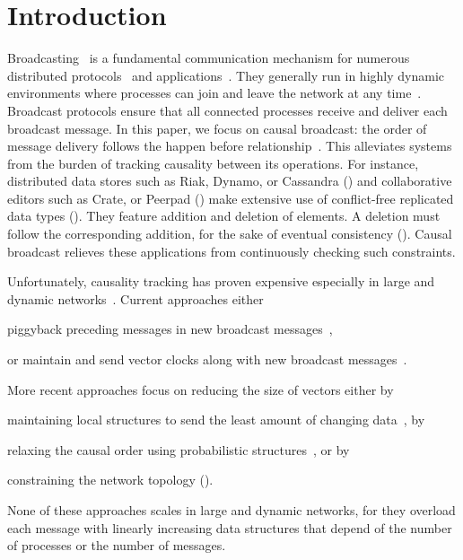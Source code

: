 
\section{Introduction}


Broadcasting~\cite{hadzilacos1994modular} is a fundamental communication
mechanism for numerous distributed
protocols~\cite{nakamoto2009bitcoin,shapiro2011comprehensive} and
applications~\cite{nedelec2016crate}. They generally run in highly dynamic
environments where processes can join and leave the network at any
time~\cite{mostefaoui2005static}. Broadcast protocols ensure that all connected
processes receive and deliver each broadcast message.
In this paper, we focus on causal broadcast: the order of message delivery
follows the happen before
relationship~\cite{lamport1978time,schwarz1994detecting}. This alleviates
systems from the burden of tracking causality between its operations.  For
instance, distributed data stores such as Riak, Dynamo, or Cassandra (\REF) and
collaborative editors such as Crate, or Peerpad (\REF) make extensive use of
conflict-free replicated data types (\REF). They feature addition and deletion
of elements. A deletion must follow the corresponding addition, for the sake of
eventual consistency (\REF). Causal broadcast relieves these applications from
continuously checking such constraints.

Unfortunately, causality tracking has proven expensive especially in large and
dynamic networks~\cite{charronbost1991concerning}. Current approaches either
\begin{inparaenum}[(i)]
\item piggyback preceding messages in new broadcast
  messages~\cite{birman1987reliable,hadzilacos1993fault},
\item or maintain and send vector clocks along with new broadcast
  messages~\cite{fidge1988timestamps,mattern1989virtual}.
\end{inparaenum}
More recent approaches focus on reducing the size of vectors either by
\begin{inparaenum}[(a)]
\item maintaining local structures to send the least amount of changing
  data~\cite{singhal1992efficient}, by
\item relaxing the causal order using probabilistic
  structures~\cite{mostefaoui2017probabilistic}, or by
\item constraining the network topology (\REF).
\end{inparaenum}
None of these approaches scales in large and dynamic networks, for they overload
each message with linearly increasing data structures that depend of the number
of processes or the number of messages.

